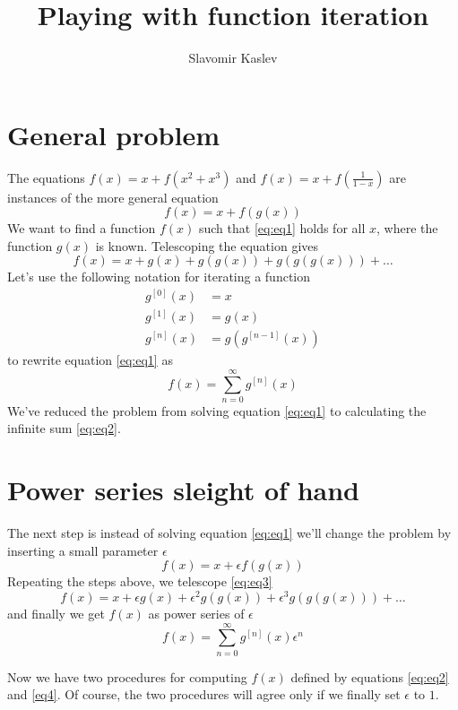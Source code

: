 \documentclass[a4paper]{article}
\title{Playing with function iteration}
\author{Slavomir Kaslev}
\begin{document}
\maketitle

\section{General problem}

The equations $f(x) = x + f(x^2 + x^3)$ and $f(x) = x + f(\frac{1}{1-x})$ are instances of the more general equation
\begin{equation}
f(x) = x + f(g(x))\label{eq:eq1}
\end{equation}
We want to find a function $f(x)$ such that \eqref{eq:eq1} holds for all $x$, where the function $g(x)$ is known. Telescoping the equation gives
$$f(x) = x + g(x) + g(g(x)) + g(g(g(x))) + \dots$$
Let's use the following notation for iterating a function
\begin{align*}
g^{[0]}(x) &= x\\
g^{[1]}(x) &= g(x)\\
g^{[n]}(x) &= g(g^{[n-1]}(x))
\end{align*}
to rewrite equation \eqref{eq:eq1} as
\begin{equation}
f(x) = \sum_{n=0}^{\infty}{g^{[n]}(x)}\label{eq:eq2}
\end{equation}
We've reduced the problem from solving equation \eqref{eq:eq1} to calculating the infinite sum \eqref{eq:eq2}.

\section{Power series sleight of hand}

The next step is instead of solving equation \eqref{eq:eq1} we'll change the problem by inserting a small parameter $\epsilon$
\begin{equation}
f(x) = x + \epsilon f(g(x))\label{eq:eq3}
\end{equation}
Repeating the steps above, we telescope \eqref{eq:eq3}
$$f(x) = x + \epsilon g(x) + \epsilon^2 g(g(x)) + \epsilon^3 g(g(g(x))) + \dots$$
and finally we get $f(x)$ as power series of $\epsilon$
\begin{equation}\label{eq4}
f(x) = \sum_{n=0}^{\infty}{g^{[n]}(x)} \epsilon^n
\end{equation}

Now we have two procedures for computing $f(x)$ defined by equations \eqref{eq:eq2} and \eqref{eq4}. Of course, the two procedures will agree only if we finally set $\epsilon$ to $1$.
\end{document}
